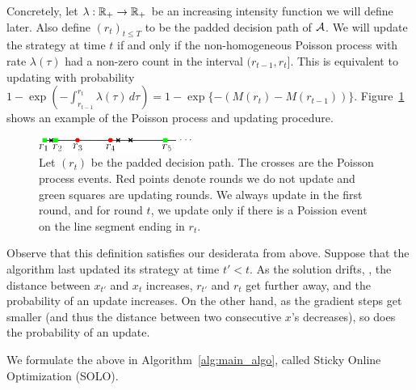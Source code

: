 Concretely, let $\lambda: \mathbb{R}_+ \to \mathbb{R}_+$ be an increasing intensity function we will define later. Also define $(r_t)_{t\leq T}$ to be the padded decision path of $\mathcal{A}$. We will update the strategy at time $t$ if and only if the non-homogeneous Poisson process with rate $\lambda(\tau)$ had a non-zero count in the interval $(r_{t-1}, r_t].$ This is equivalent to updating with probability  $1 - \exp(-\int_{r_{t-1}}^{r_t} \lambda(\tau)\, d\tau)  = 1 - \exp\{-(M(r_t)- M(r_{t-1}))\}$. Figure~\ref{fig:poisson} shows an example of the Poisson process and updating procedure.

\begin{figure}[h!]
    \centering
    \includegraphics[width=5cm]{figures/poisson}
    \caption{Let $(r_t)$ be the padded decision path. The crosses are the Poisson process events. Red points denote rounds we do not update and green squares are updating rounds. We always update in the first round, and for round $t$, we update only if there is a Poission event on the line segment ending in $r_t$.}
    \label{fig:poisson}
\end{figure}

Observe that this definition satisfies our desiderata from above. Suppose that the algorithm last updated its strategy at time $t' < t$. As the solution drifts, \ie, the distance between $x_{t'}$ and $x_t$ increases, $r_{t'}$ and $r_t$ get further away, and the probability of an update increases. On the other hand, as the gradient steps get smaller (and thus the distance between two consecutive $x$'s decreases), so does the probability of an update. 

We formulate the above in Algorithm~\ref{alg:main_algo}, called Sticky Online Optimization (SOLO). 

